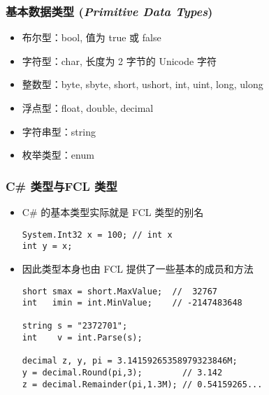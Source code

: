 \begin{frame}
\frametitle{基本数据类型  (\textit{Primitive Data Types})}
\begin{itemize}
    \setlength{\itemsep}{8pt plus 1pt}
\item 布尔型：bool, 值为 true 或 false
\item 字符型：char, 长度为 2 字节的 Unicode 字符
\item 整数型：byte, sbyte, short, ushort, int, uint, long, ulong
\item 浮点型：float, double, decimal
\item 字符串型：string
\item 枚举类型：enum
\end{itemize}
\end{frame}


\begin{frame}[fragile]
\frametitle{C\# 类型与FCL 类型}
\begin{itemize}
\item C\# 的基本类型实际就是 FCL 类型的别名
\begin{lstlisting}
System.Int32 x = 100; // int x
int y = x;
\end{lstlisting}
\pause
\item 因此类型本身也由 FCL 提供了一些基本的成员和方法

\begin{lstlisting}
short smax = short.MaxValue;  //  32767
int   imin = int.MinValue;    // -2147483648

string s = "2372701";
int    v = int.Parse(s);

decimal z, y, pi = 3.14159265358979323846M;
y = decimal.Round(pi,3);        // 3.142
z = decimal.Remainder(pi,1.3M); // 0.54159265...

\end{lstlisting}
\end{itemize}
\end{frame}

